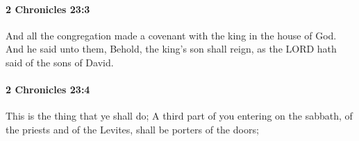 		\paragraph{2 Chronicles 23:3} %
			\label{2CHRONICLES-23-3}

			And all the congregation made a covenant with the king in the house of God. And he said unto them, Behold, the king's son shall reign, as the LORD hath said of the sons of David.


		\paragraph{2 Chronicles 23:4} %
			\label{2CHRONICLES-23-4}

			This is the thing that ye shall do; A third part of you entering on the sabbath, of the priests and of the Levites, shall be porters of the doors;


